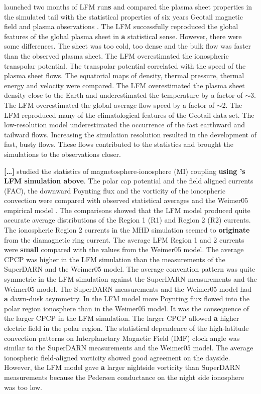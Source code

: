 \documentclass[linenumbers,draft]{agujournal}
\begin{document}
\citet{guild08:_geotail_lfm1,guild08:_geotail_lfm2} launched two months of LFM run\textbf{s} and compared the plasma sheet properties in the simulated tail with the statistical properties of six years Geotail magnetic field and plasma observations \citep{kokubun94:_geotail_magnet_field_exper,mukai94:_low_energ_partic_lep_exper_geotail_satel}. The LFM successfully reproduced the global features of the global plasma sheet in \textbf{a} statistical sense. However, there were some differences. The sheet was too cold, too dense and the bulk flow was faster than the observed plasma sheet. The LFM overestimated the ionospheric transpolar potential. The transpolar potential correlated with the speed of the plasma sheet flows. The equatorial maps of density, thermal pressure, thermal energy and velocity were compared. The LFM overestimated the plasma sheet density close to the Earth and underestimated the temperature by a factor of $\sim$3. The LFM overestimated the global average flow speed by a factor of $\sim$2. The LFM reproduced many of the climatological features of the Geotail data set. The low-resolution model underestimated the occurrence of the fast earthward and tailward flows. Increasing the simulation resolution resulted in the development of fast, busty flows. These flows contributed to the statistics and brought the simulations to the observations closer.

\citet{zhang11:_lyon_fedder_mobar_mhd} \textbf{[\dots]} studied the statistics of magnetosphere-ionosphere (MI) coupling \textbf{using \citet{guild08:_geotail_lfm1}'s LFM simulation above}. The polar cap potential and the field aligned currents (FAC), the downward Poynting flux and the vorticity of the ionospheric convection were compared with observed statistical averages and the Weimer05 empirical model \citep{weimer05:_improv_joule}. The comparisons showed that the LFM model produced quite accurate average distributions of the Region 1 (R1) and Region 2 (R2) currents. The ionospheric Region 2 currents in the MHD simulation seemed to \textbf{originate} from the diamagnetic ring current. The average LFM Region 1 and 2 currents were \textbf{small} compared with the values from the Weimer05 model. The average CPCP was higher in the LFM simulation than the measurements of the SuperDARN and the Weimer05 model. The average convention pattern was quite symmetric in the LFM simulation against the SuperDARN measurements and the Weimer05 model. The SuperDARN measurements and the Weimer05 model had \textbf{a} dawn-dusk asymmetry. In the LFM model more Poynting flux flowed into the polar region ionosphere than in the Weimer05 model. It was the consequence of the larger CPCP in the LFM simulation. The larger CPCP allowed \textbf{a} higher electric field in the polar region. The statistical dependence of the high-latitude convection patterns on Interplanetary Magnetic Field (IMF) clock angle was similar to the SuperDARN measurements \citep{sofko95:_direc_super} and the Weimer05 model. The average ionospheric field-aligned vorticity showed good agreement on the dayside. However, the LFM model gave \textbf{a} larger nightside vorticity than SuperDARN measurements because the Pedersen conductance on the night side ionosphere was too low. 
\end{document}
